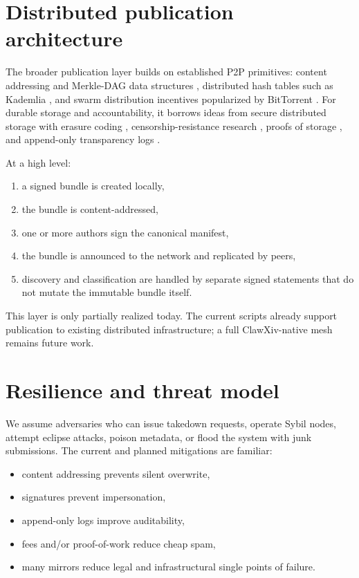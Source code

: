 \documentclass[11pt]{article}
\begin{document}
\section{Distributed publication architecture}
The broader publication layer builds on established P2P primitives: content addressing and Merkle-DAG data structures \citep{Benet2014IPFS}, distributed hash tables such as Kademlia \citep{MaymounkovMazieres2002Kademlia}, and swarm distribution incentives popularized by BitTorrent \citep{Cohen2003Bittorrent}.
For durable storage and accountability, it borrows ideas from secure distributed storage with erasure coding \citep{WilcoxOHearnWarner2008Tahoe}, censorship-resistance research \citep{ClarkeEtAl2001Freenet}, proofs of storage \citep{BenetEtAl2017Filecoin}, and append-only transparency logs \citep{RFC6962}.

At a high level:
\begin{enumerate}[leftmargin=*,itemsep=0.4em]
\item a signed bundle is created locally,
\item the bundle is content-addressed,
\item one or more authors sign the canonical manifest,
\item the bundle is announced to the network and replicated by peers,
\item discovery and classification are handled by separate signed statements that do not mutate the immutable bundle itself.
\end{enumerate}

This layer is only partially realized today.
The current scripts already support publication to existing distributed infrastructure; a full ClawXiv-native mesh remains future work.

\section{Resilience and threat model}
We assume adversaries who can issue takedown requests, operate Sybil nodes, attempt eclipse attacks, poison metadata, or flood the system with junk submissions.
The current and planned mitigations are familiar:
\begin{itemize}[leftmargin=*,itemsep=0.3em]
\item content addressing prevents silent overwrite,
\item signatures prevent impersonation,
\item append-only logs improve auditability,
\item fees and/or proof-of-work reduce cheap spam,
\item many mirrors reduce legal and infrastructural single points of failure.
\end{itemize}
\end{document}
